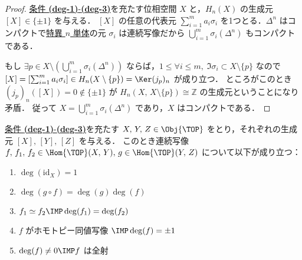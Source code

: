 \documentclass[algtopo_main]{subfiles}
\begin{document}
\begin{proof}
    \hyperref[def:degree]{条件 \textbf{\textsf{(deg-1)}}-\textbf{\textsf{(deg-3)}}}を充たす位相空間 $X$ と，$H_n(X)$ の生成元 $[X] \in \{\pm 1\}$ を与える．
    $[X]$ の任意の代表元 $\sum_{i=1}^m a_i \sigma_i$ を1つとる．$\Delta^n$ はコンパクトで\hyperref[def:singularsimplex]{特異 $n$ 単体}の元 $\sigma_i$ は連続写像だから $\bigcup_{i=1}^m \sigma_i(\Delta^n)$ もコンパクトである．
    
    もし $\exists p \in X \setminus \left(\bigcup_{i=1}^m \sigma_i (\Delta^n)\right)$ ならば，$1\le \forall i \le m,\; \Im \sigma_i \subset X \setminus \{p\}$ なので $[X] = [\sum_{i=1}^m a_i \sigma_i] \in H_n(X \setminus \{p\}) = \Ker (j_p)_n$ が成り立つ．
    ところがこのとき $(j_p)_n([X]) = 0 \notin \{\pm 1\}$ が $H_n(X,\, X \setminus \{p\}) \cong \mathbb{Z}$ の生成元ということになり矛盾．
    従って $X = \bigcup_{i=1}^m \sigma_i (\Delta^n)$ であり，$X$ はコンパクトである．
\end{proof}



\begin{myprop}[label=lem:degree-basic]{}
    \hyperref[def:degree]{条件 \textbf{\textsf{(deg-1)}}-\textbf{\textsf{(deg-3)}}}を充たす $X,\, Y,\, Z \in \Obj{\TOP}$ をとり，それぞれの生成元 $[X],\, [Y],\, [Z]$ を与える．
    このとき連続写像 $f,\, f_1,\, f_2 \in \Hom{\TOP}(X,\, Y),\,  g \in \Hom{\TOP}(Y,\, Z)$ について以下が成り立つ：
    \begin{enumerate}
        \item $\deg(\mathrm{id}_X) = 1$
        \item $\deg(g \circ f) = \deg(g)\deg(f)$
        \item $f_1 \simeq f_2 \IMP \deg(f_1) = \deg(f_2)$
        \item $f$ がホモトピー同値写像 $\IMP \deg(f) = \pm 1$
        \item $\deg(f) \neq 0 \IMP f$ は全射
    \end{enumerate}
\end{myprop}
\end{document}
